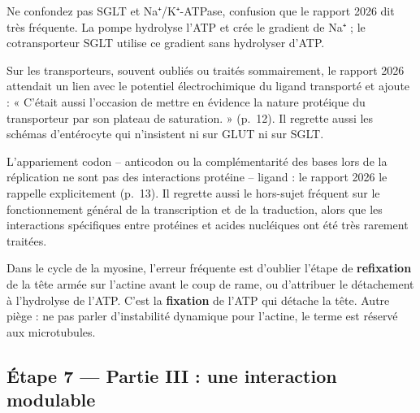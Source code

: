 \documentclass[11pt,a4paper]{article}
\begin{document}
\begin{piege}

Ne confondez pas SGLT et Na⁺/K⁺-ATPase, confusion que le rapport 2026 dit très fréquente. La pompe hydrolyse l'ATP et crée le gradient de Na⁺ ; le cotransporteur SGLT utilise ce gradient sans hydrolyser d'ATP.

\end{piege}

\begin{jury}

Sur les transporteurs, souvent oubliés ou traités sommairement, le rapport 2026 attendait un lien avec le potentiel électrochimique du ligand transporté et ajoute : « C'était aussi l'occasion de mettre en évidence la nature protéique du transporteur par son plateau de saturation. » (p.~12). Il regrette aussi les schémas d'entérocyte qui n'insistent ni sur GLUT ni sur SGLT.

\end{jury}

\begin{piege}

L'appariement codon -- anticodon ou la complémentarité des bases lors de la réplication ne sont pas des interactions protéine -- ligand : le rapport 2026 le rappelle explicitement (p.~13). Il regrette aussi le hors-sujet fréquent sur le fonctionnement général de la transcription et de la traduction, alors que les interactions spécifiques entre protéines et acides nucléiques ont été très rarement traitées.

\end{piege}

\begin{piege}

Dans le cycle de la myosine, l'erreur fréquente est d'oublier l'étape de \textbf{refixation} de la tête armée sur l'actine avant le coup de rame, ou d'attribuer le détachement à l'hydrolyse de l'ATP. C'est la \textbf{fixation} de l'ATP qui détache la tête. Autre piège : ne pas parler d'instabilité dynamique pour l'actine, le terme est réservé aux microtubules.

\end{piege}

\hypertarget{uxe9tape-7-partie-iii-une-interaction-modulable}{%
\subsection{Étape 7 --- Partie III : une interaction modulable}\label{uxe9tape-7-partie-iii-une-interaction-modulable}}
\end{document}
